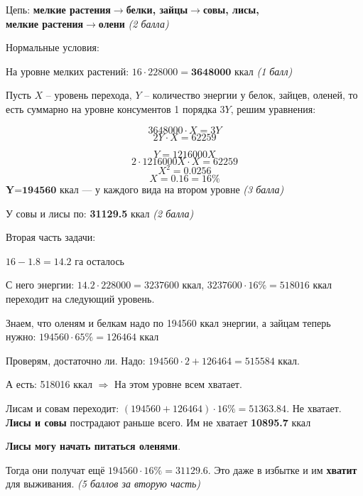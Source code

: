 \solutionSection

Цепь: \textbf{мелкие растения$\to$белки, зайцы$\to$совы, лисы, \\
мелкие растения$\to$олени} \textit{(2 балла)}

Нормальные условия:

На уровне мелких растений: $16\cdot228000=\textbf{3648000}$ ккал \textit{(1 балл)}

Пусть $X$ – уровень перехода, $Y$ – количество энергии у белок, зайцев, оленей, то есть суммарно на уровне консументов 1 порядка $3Y$, решим уравнения:

$$3648000\cdot X=3Y$$
$$2Y\cdot X=62259$$

$$Y=1216000X$$
$$2\cdot1216000X\cdot X=62259$$
$$X^2=0.0256$$
$$X=0.16=16\%$$
$\textbf{Y=194560}$ ккал — у каждого вида на втором уровне \textit{(3 балла)}

У совы и лисы по: \textbf{31129.5} ккал \textit{(2 балла)}

Вторая часть задачи:

$16-1.8 = 14.2$ га осталось

С него энергии: $14.2\cdot228000=3237600$ ккал, $3237600\cdot16\%=518016$ ккал переходит на следующий уровень.

Знаем, что оленям и белкам надо по 194560 ккал энергии, а зайцам теперь нужно: $194560\cdot65\%=126464$ ккал

Проверям, достаточно ли. Надо: $194560\cdot2+126464=515584$ ккал.

А есть: 518016 ккал $\Rightarrow$ На этом уровне всем хватает.

Лисам и совам переходит: $(194560+126464)\cdot16\%=51363.84$. Не хватает. \textbf{Лисы и совы} пострадают раньше всего. Им не хватает \textbf{10895.7} ккал

\textbf{Лисы могу начать питаться оленями}. 

Тогда они получат ещё $194560\cdot16\%=31129.6$. Это даже в избытке и им \textbf{хватит} для выживания. \textit{(5 баллов за вторую часть)}